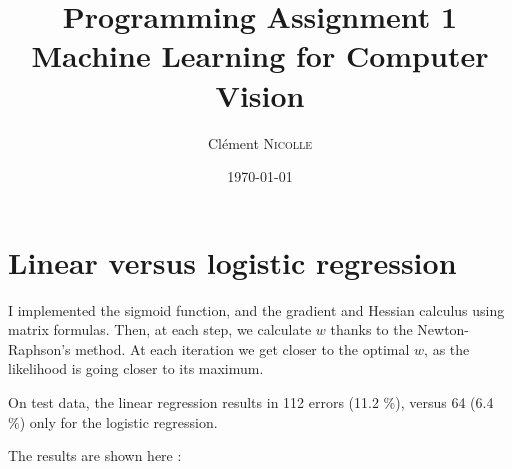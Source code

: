 \documentclass[a4paper, 12pt]{article}
\begin{document}
 
\title{Programming Assignment 1 \\ Machine Learning for Computer Vision}
\author{Clément \textsc{Nicolle}}
\date{\today} 
 
\maketitle

\section{Linear versus logistic regression}

I implemented the sigmoid function, and the gradient and Hessian calculus using matrix formulas. Then, at each step, we calculate $w$ thanks to the Newton-Raphson's method. At each iteration we get closer to the optimal $w$, as the likelihood is going closer to its maximum.

On test data, the linear regression results in 112 errors (11.2 \%), versus 64 (6.4 \%) only for the logistic regression.

\medskip
The results are shown here :
\end{document}
